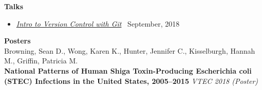 \documentclass{resume}
\begin{document}
\textbf{Talks}

\begin{itemize}
  \item \href{https://beansrowning.github.io/git-talk}{\textit{Intro to Version Control with Git}} \, September, 2018 \\
\end{itemize}

\textbf{Posters} \\

Browning, Sean D., Wong, Karen K., Hunter, Jennifer C., Kisselburgh, Hannah M., Griffin, Patricia M. \\ 
\textbf{National Patterns of Human Shiga Toxin-Producing Escherichia coli (STEC) Infections in the United States, 2005–2015} \textit{VTEC 2018 (Poster)} \\



%
%
\end{document}
